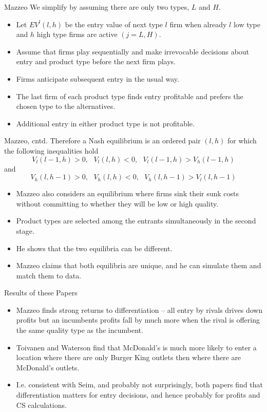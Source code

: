 \documentclass[aspectratio=169,11pt]{beamer}
\begin{document}
\begin{frame}{Mazzeo}
We simplify by assuming there are only two types, $L$ and $H$.
\begin{itemize}
\item Let $EV^{l}(l,h)$ be the entry value of next type $l$ firm when
already $l$ low type and $h$ high type firms are active $(j=L,H)$.
\item Assume that firms play sequentially and make irrevocable decisions
about entry and product type before the next firm plays.
\item Firms anticipate subsequent entry in the usual way.
\item The last firm of each product type finds entry profitable and prefers
the chosen type to the alternatives.
\item Additional entry in either product type is not profitable.
\end{itemize}
\end{frame}

\begin{frame}{Mazzeo, cntd.}
Therefore a Nash equilibrium is an ordered pair $(l,h)$ for which the
following inequalities hold 
\begin{equation*}
V_{l}(l-1,h)>0,\text{ }V_{l}(l,h)<0,\text{ }V_{l}(l-1,h)>V_{h}(l-1,h)
\end{equation*}%
and 
\begin{equation*}
V_{h}(l,h-1)>0,\text{ }V_{h}(l,h)<0,\text{ }V_{h}(l,h-1)>V_{l}(l,h-1)
\end{equation*}
\begin{itemize}
\item Mazzeo also considers an equilibrium where firms sink their sunk costs
without committing to whether they will be low or high quality.
\item Product types are selected among the entrants simultaneously in the
second stage.
\item He shows that the two equilibria can be different.
\item Mazzeo claims that both equilibria are unique, and he can simulate
them and match them to data.
\end{itemize}
\end{frame}

\begin{frame}{Results of these Papers}
\begin{itemize}
\item Mazzeo finds strong returns to differentiation -- all entry by rivals
drives down profits but an incumbents profits fall by much more when the
rival is offering the same quality type as the incumbent.
\item Toivanen and Waterson find that McDonald's is much more likely to
enter a location where there are only Burger King outlets then where there
are McDonald's outlets.
\item I.e. consistent with Seim, and probably not surprisingly, both papers
find that differentiation matters for entry decisions, and hence probably
for profits and CS calculations.
\end{itemize}
\end{frame}
\end{document}
